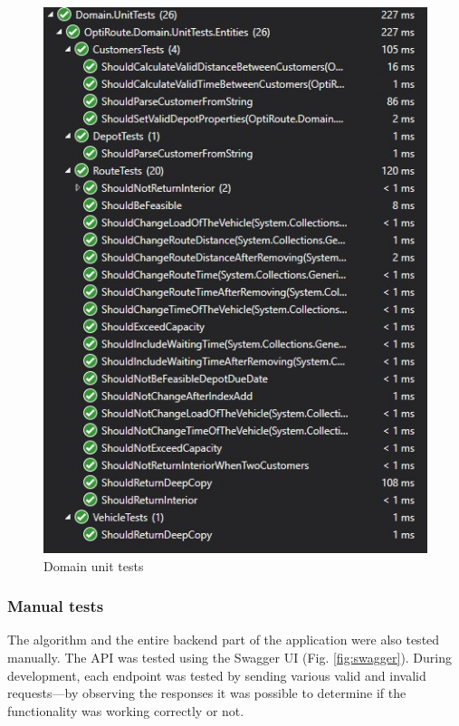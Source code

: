 \documentclass[a4paper,twoside,12pt]{book}
\begin{document}
\begin{figure}[htbp]
\centering
\includegraphics[width=\textwidth]{images/domainTests.jpg}
\caption{Domain unit tests}
\label{fig:unitTestsRun}
\end{figure}

\subsubsection{Manual tests}
The algorithm and the entire backend part of the application were also tested manually. The API was tested using the Swagger UI (Fig. \ref{fig:swagger}). During development, each endpoint was tested by sending various valid and invalid requests---by observing the responses it was possible to determine if the functionality was working correctly or not. 
\end{document}
